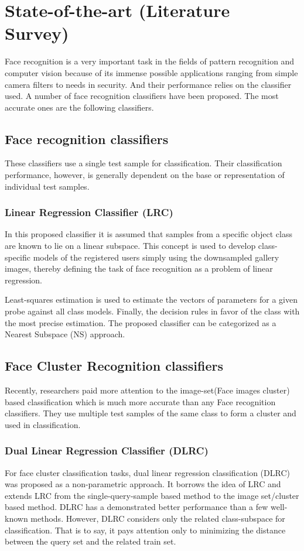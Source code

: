 \documentclass[a4paper]{article}
\begin{document}
	\section{State-of-the-art (Literature Survey)}
	Face recognition is a very important task in the fields of pattern recognition and computer vision because of its immense possible applications ranging from simple camera filters to needs in security. And their performance relies on the classifier used. A number of face recognition classifiers have been proposed. The most accurate ones are the following classifiers.
		\subsection{Face recognition classifiers}
		These classifiers use
		a single test sample for classification. Their classification
		performance, however, is generally dependent on the base
		or representation of individual test samples. 
		\subsubsection{Linear Regression Classifier (LRC)}
			In this proposed classifier it is assumed that samples from a specific object class are known to
			lie on a linear subspace. This concept is used to develop
			class-specific models of the registered users simply using the
			downsampled gallery images, thereby defining the task of face
			recognition as a problem of linear regression. 
			
			Least-squares
			estimation is used to estimate the vectors of parameters for a
			given probe against all class models. Finally, the decision rules in
			favor of the class with the most precise estimation. The proposed
			classifier can be categorized as a Nearest Subspace (NS) approach.
			
		\subsection{Face Cluster Recognition classifiers}
		Recently, researchers
		paid more attention to the image-set(Face images cluster) based classification which is much more accurate than any Face recognition classifiers. They use multiple test samples of the same class to form a cluster and used in classification.
		\subsubsection{Dual Linear Regression Classifier (DLRC)}
			For face cluster classification tasks, dual linear regression classification
			(DLRC) was proposed as a non-parametric approach.
			It borrows the idea of LRC and extends LRC
			from the single-query-sample based method to the image set/cluster
			based method. DLRC has a demonstrated better performance
			than a few well-known methods. However, DLRC
			considers only the related class-subspace for classification.
			That is to say, it pays attention only to minimizing the distance
			between the query set and the related train set.
\end{document}
